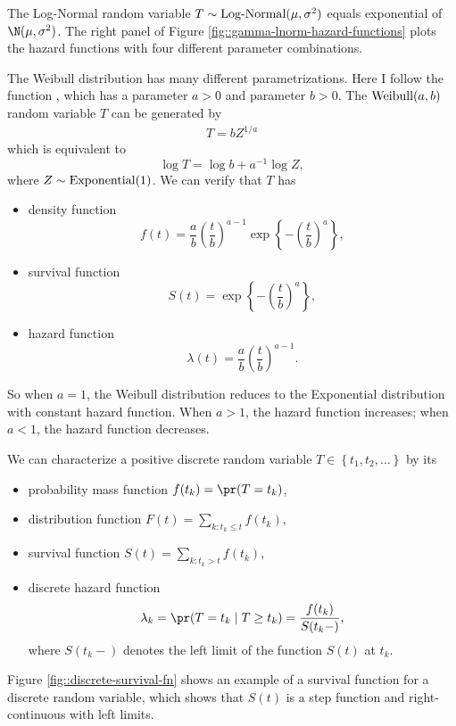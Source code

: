 \begin{example}
The Log-Normal random variable $T \sim \textup{Log-Normal}(\mu,\sigma^2)$ equals exponential of $\N(\mu,\sigma^2)$. The right panel of Figure \ref{fig::gamma-lnorm-hazard-functions} plots the hazard functions with four different parameter combinations. 
\end{example}



\begin{example}
[Weibull]\label{eg::weibull}
The Weibull distribution has many different parametrizations. Here I follow the  function , which has a  parameter $a>0$ and  parameter $b>0$. The $\textup{Weibull}(a,b)$ random variable $T$ can be generated by
\begin{eqnarray}
\label{eq::weibull-representation}
T = b Z^{1/a}
\end{eqnarray}
which is equivalent to
\[
\log T = \log b + a^{-1} \log Z,
\]
where $Z\sim  \textup{Exponential}(1)$. We can verify that  $T$ has 
\begin{itemize}
\item 
density function
$$
f(t)=  \frac{a}{b} \left(  \frac{t}{b}   \right)^{a-1} \exp\left\{  - \left(  \frac{t}{b}   \right)^a \right\},
$$
\item
survival function
$$
S(t)  = \exp\left\{  - \left(  \frac{t}{b}   \right)^a \right\},
$$
\item 
hazard function
$$
\lambda(t) = \frac{a}{b} \left(  \frac{t}{b}   \right)^{a-1}.
$$
\end{itemize}
So when $a=1$, the Weibull distribution reduces to the Exponential distribution with constant hazard function. When $a>1$, the hazard function increases; when $a<1$, the hazard function decreases. 
\end{example}
 



\begin{example}
We can characterize a positive discrete  random variable $T\in\left\{ t_{1},t_{2},\ldots\right\} $
by its 
\begin{itemize}
\item 
probability mass function $f(t_{k})=\pr(T=t_{k})$, 
\item
distribution
function $F(t)=\sum_{k:t_{k}\leq t}f(t_{k})$, 
\item
survival function $S(t)=\sum_{k:t_{k}>t}f(t_{k})$,
\item 
discrete hazard function
\[
\lambda_{k}=\pr(T=t_{k}\mid T\geq t_{k})=\frac{f(t_{k})}{S(t_{k}-)},
\]
where $S(t_{k}-)$ denotes the left limit of the function $S(t)$
at $t_{k}$. 
\end{itemize}
Figure \ref{fig::discrete-survival-fn} shows an example of a survival function for a discrete random variable, which shows that $S(t)$ is a step function and right-continuous with left limits. 
\end{example}


